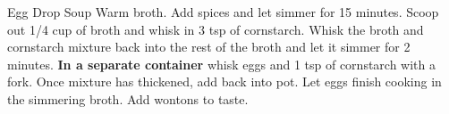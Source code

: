 \documentclass[../cookbook.tex]{subfiles}
\begin{document}
\begin{recipe}{Egg Drop Soup}{}{}
    Warm broth.
    Add spices and let simmer for 15 minutes.
    Scoop out 1/4 cup of broth and whisk in 3 tsp of cornstarch. Whisk the
    broth and cornstarch mixture back into the rest of the broth and let it
    simmer for 2 minutes.
    \textbf{In a separate container} whisk eggs and 1 tsp of cornstarch with
    a fork. Once mixture has thickened, add back into pot. Let eggs finish
    cooking in the simmering broth.
    Add wontons to taste.
\end{recipe}
\end{document}
